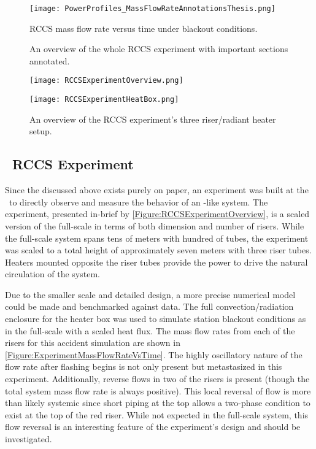 \begin{figure}%
    \centering
    \caption[RCCS mass flow rate under blackout conditions]{RCCS mass flow rate versus time under blackout conditions.}%
    \label{Figure:RCCSFullScaleMassFlowRate}%
    \texttt{[image: PowerProfiles\_MassFlowRateAnnotationsThesis.png]}%
\end{figure}


\begin{figure}%
    \centering
    \caption[RCCS Experiment Full System diagram]{An overview of the whole RCCS experiment with important sections annotated.}%
    \label{Figure:RCCSExperimentOverview}%
    \texttt{[image: RCCSExperimentOverview.png]}
    \vspace*{4em}
    \centering
    \caption[RCCS Experiment Three Riser diagram]{An overview of the RCCS experiment's three riser/radiant heater setup.}%
    \label{Figure:RCCSExperimentHeatBox}%
    \texttt{[image: RCCSExperimentHeatBox.png]}%
\end{figure}

\subsection{\TheUniversity\ RCCS Experiment}
Since the  discussed above exists purely on paper, an experiment was built at the \TheUniversity\ to directly observe and measure the behavior of an -like system.
The experiment, presented in-brief by \cref{Figure:RCCSExperimentOverview}, is a scaled version of the full-scale  in terms of both dimension and number of risers.
While the full-scale system spans tens of meters with hundred of tubes, the experiment was scaled to a total height of approximately seven meters with three riser tubes.
Heaters mounted opposite the riser tubes provide the power to drive the natural circulation of the system.

Due to the smaller scale and detailed design, a more precise numerical model could be made and benchmarked against data.
The full convection/radiation enclosure for the heater box was used to simulate station blackout conditions as in the full-scale with a scaled heat flux.
The mass flow rates from each of the risers for this accident simulation are shown in \cref{Figure:ExperimentMassFlowRateVsTime}.
The highly oscillatory nature of the flow rate after flashing begins is not only present but metastasized in this experiment.
Additionally, reverse flows in two of the risers is present (though the total system mass flow rate is always positive).
This local reversal of flow is more than likely systemic since short piping at the top allows a two-phase condition to exist at the top of the red riser.
While not expected in the full-scale system, this flow reversal is an interesting feature of the experiment's design and should be investigated.

